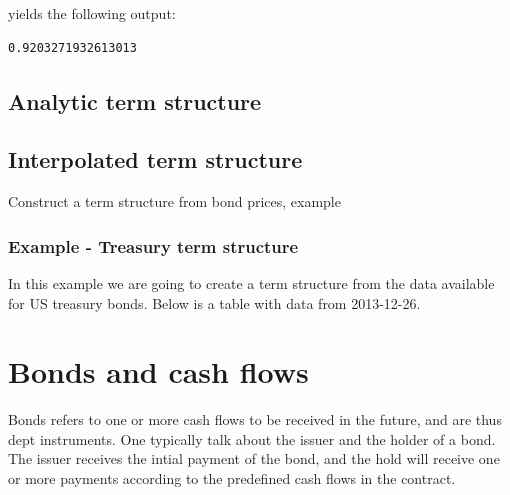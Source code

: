 \documentclass[11pt,a4paper]{article}
\numberwithin{equation}{section}
\begin{document}
	yields the following output:
	\FrameSep

	\begin{lstlisting}[style=Output]
	0.9203271932613013
	\end{lstlisting}

	\subsection{Analytic term structure}

	\subsection{Interpolated term structure}
	Construct a term structure from bond prices, example

	\subsubsection{Example - Treasury term structure}
	In this example we are going to create a term structure from the data available for
	US treasury bonds. Below is a table with data from 2013-12-26.





	\section{Bonds and cash flows}
	Bonds refers to one or more cash flows to be received in the future, and are thus dept instruments. One typically talk about the issuer and the holder of a bond. The issuer receives the intial payment of the bond, and the hold will receive one or more payments according to the predefined cash flows in the contract.
\end{document}
